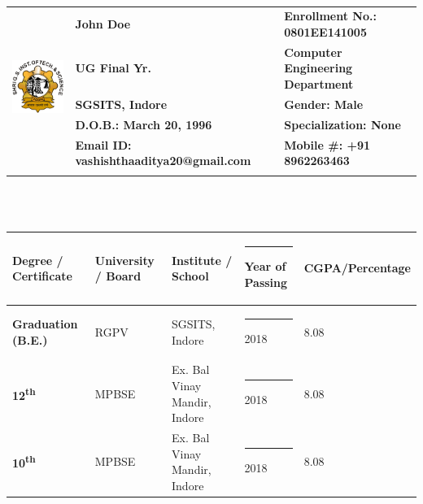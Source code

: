 \documentclass[a4paper,10pt]{article}
\begin{document}
\hspace{0.5cm}\\[-0.2cm]


\begin{tabular}{  m{10em} m{23em} l @{}  }
		\multirow{5}{10em}{	\includegraphics[scale=0.40]{CollegeLogo}	}
		& \textbf{John Doe} & \textbf{Enrollment No.: 0801EE141005} \\
		& \textbf{UG Final Yr.} & \textbf{Computer Engineering Department} \\
		& \textbf{SGSITS, Indore} & \textbf{Gender: Male}  \\
		& \textbf{D.O.B.: March 20, 1996} & \textbf{Specialization: None} \\
		& \textbf{Email ID: vashishthaaditya20@gmail.com  } & \textbf{Mobile \#: +91 8962263463 } \\
		\\ [2ex]
		\hline
\end{tabular} \\ \\
	\renewcommand{\arraystretch}{1.5}
	\newcommand{\LSpace}{ \rule{2em}{0em} }
\indent

\begin{tabular}{ m{10em} m{10em} m{10em} m{10em} m{9em}  }
\hline
	\textbf{Degree / Certificate} & \textbf{University / Board} & \textbf{Institute / School}   & \LSpace \textbf{Year of Passing} & \textbf{CGPA/Percentage} \\ [0.25ex]
\hline
\textbf{Graduation (B.E.)} & RGPV & SGSITS, Indore & \LSpace 2018 & 8.08 \\ [0.25ex]
\hline
\textbf{  12\textsuperscript{th} } & MPBSE & Ex. Bal Vinay Mandir, Indore  & \LSpace 2018 & 8.08 \\ [0.25ex]
\hline
\textbf{ 10\textsuperscript{th} } & MPBSE & Ex. Bal Vinay Mandir, Indore & \LSpace 2018 & 8.08 \\ [0.25ex]
\hline
\end{tabular}
\\ \\
\end{document}
